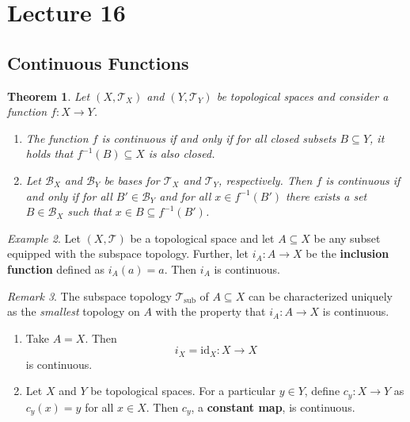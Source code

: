 \documentclass[ 12pt ]{article}
\newcounter{lecture_num}
\theoremstyle{plain}
\theoremstyle{plain}
\newtheorem{theorem}{Theorem}[lecture_num]
\theoremstyle{definition}
\theoremstyle{remark}
\newtheorem{remark}[theorem]{Remark}
\newtheorem{example}[theorem]{Example}
\begin{document}
\setcounter{lecture_num}{16}
\setcounter{theorem}{0}
\section*{Lecture 16}

\subsection*{Continuous Functions}

\begin{theorem}
	Let $(X, \mathcal{T}_X)$ and $(Y, \mathcal{T}_Y)$ be topological spaces and consider a function $f : X \to Y$.
	\begin{enumerate}
		\item The function $f$ is continuous if and only if for all closed subsets $B \subseteq Y$, it holds that $f^{-1}(B) \subseteq X$ is also closed.
		\item Let $\mathcal{B}_X$ and $\mathcal{B}_Y$ be bases for $\mathcal{T}_X$ and $\mathcal{T}_Y$, respectively. Then $f$ is continuous if and only if for all $B' \in \mathcal{B}_Y$
		and for all $x \in f^{-1}(B')$ there exists a set $B \in \mathcal{B}_X$ such that $x \in B \subseteq f^{-1}(B')$.
	\end{enumerate}
\end{theorem}

\begin{example}
	Let $(X, \mathcal{T})$ be a topological space and let $A \subseteq X$ be any subset equipped with the subspace topology. Further, let $i_A : A \to X$ be the \textbf{inclusion
	function} defined as $i_A(a) = a$. Then $i_A$ is continuous.
\end{example}

\begin{remark}
	The subspace topology $\mathcal{T}_\mathrm{sub}$ of $A \subseteq X$ can be characterized uniquely as the \textit{smallest} topology on $A$ with the property that $i_A : A \to X$ is
	continuous.
	\begin{enumerate}
		\item Take $A = X$. Then $$i_X = \mathrm{id}_X : X \to X$$ is continuous.
		\item Let $X$ and $Y$ be topological spaces. For a particular $y \in Y$, define $c_y : X \to Y$ as $c_y(x) = y$ for all $x \in X$. Then $c_y$, a \textbf{constant map}, is
			continuous.
	\end{enumerate}
\end{remark}
\end{document}
